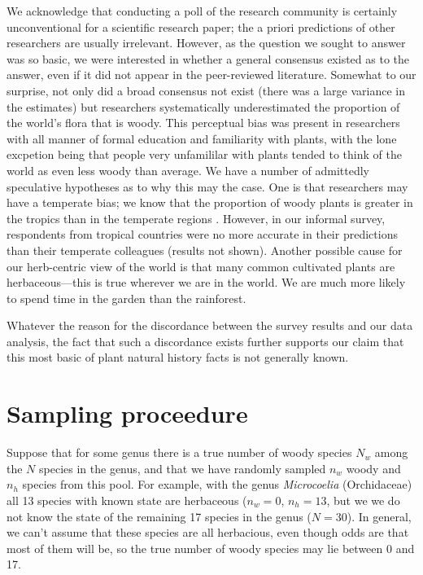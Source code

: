 \documentclass[12pt]{article}
\begin{document}
We acknowledge that conducting a poll of the research community is certainly unconventional for a scientific research paper; the a priori predictions of other researchers are usually irrelevant. However, as the question we sought to answer was so basic, we were interested in whether a general consensus existed as to the answer, even if it did not appear in the peer-reviewed literature. Somewhat to our surprise, not only did a broad consensus not exist (there was a large variance in the estimates) but researchers systematically underestimated the proportion of the world's flora that is woody. This perceptual bias was present in researchers with all manner of formal education and familiarity with plants, with the lone excpetion being that people very unfamililar with plants tended to think of the world as even less woody than average. We have a number of admittedly speculative hypotheses as to why this may the case. One is that researchers may have a temperate bias; we know that the proportion of woody plants is greater in the tropics than in the temperate regions \citep{Molesheihgt}. However, in our informal survey, respondents from tropical countries were no more accurate in their predictions than their temperate colleagues (results not shown). Another possible cause for our herb-centric view of the world is that many common cultivated plants are herbaceous---this is true wherever we are in the world. We are much more likely to spend time in the garden than the rainforest. 

Whatever the reason for the discordance between the survey results and our data analysis, the fact that such a discordance exists further supports our claim that this most basic of plant natural history facts is not generally known.   


\clearpage
\setcounter{secnumdepth}{1}
\appendix
\section{Sampling proceedure}

Suppose that for some genus there is a true number of woody species
$N_w$ among the $N$ species in the genus, and that we have randomly
sampled $n_w$ woody and $n_h$ species from this pool.
%
For example, with the genus \textit{Microcoelia} (Orchidaceae) all 13
species with known state are herbaceous ($n_w = 0$, $n_h = 13$, but we
we do not know the state of the remaining 17 species in the genus ($N
= 30$).  In general, we can't assume that these species are all
herbacious, even though odds are that most of them will be, so the
true number of woody species may lie between 0 and 17.
\end{document}
